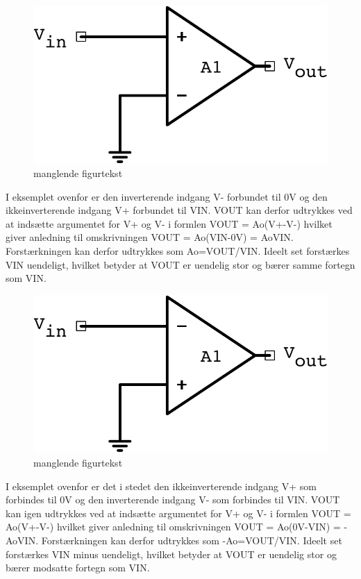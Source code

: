 \begin{figure}[H]
\centering
\includegraphics[resolution=300,width=\textwidth/2]{Figure/Introduktion/NonInvertingOpAmp.pdf}
\caption{manglende figurtekst}
\label{fig:IkkeInverterendeOpAmp}
\end{figure}
\noindent
%
I eksemplet ovenfor er den inverterende indgang V- forbundet til 0V og den ikkeinverterende indgang V+ forbundet til VIN. VOUT kan derfor udtrykkes ved at indsætte argumentet for V+ og V- i formlen VOUT = Ao(V+-V-) hvilket giver anledning til omskrivningen VOUT = Ao(VIN-0V) = AoVIN. Forstærkningen kan derfor udtrykkes som Ao=VOUT/VIN. Ideelt set forstærkes VIN uendeligt, hvilket betyder at VOUT er uendelig stor og bærer samme fortegn som VIN.
%
\begin{figure}[H]
\centering
\includegraphics[resolution=300,width=\textwidth/2]{Figure/Introduktion/InvertingOpAmp.pdf}
\caption{manglende figurtekst}
\label{fig:InverterendeOpAmp}
\end{figure}
\noindent
%
I eksemplet ovenfor er det i stedet den ikkeinverterende indgang V+ som forbindes til 0V og den inverterende indgang V- som forbindes til VIN. VOUT kan igen udtrykkes ved at indsætte argumentet for V+ og V- i formlen VOUT = Ao(V+-V-) hvilket giver anledning til omskrivningen VOUT = Ao(0V-VIN) = -AoVIN. Forstærkningen kan derfor udtrykkes som -Ao=VOUT/VIN. Ideelt set forstærkes VIN minus uendeligt, hvilket betyder at VOUT er uendelig stor og bærer modsatte fortegn som VIN.\\
